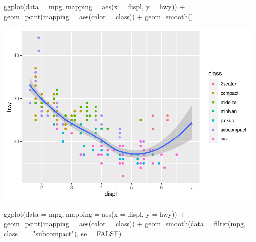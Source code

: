 \documentclass[
]{article}
\newenvironment{Shaded}{\begin{snugshade}}{\end{snugshade}}
\newcommand{\AttributeTok}[1]{\textcolor[rgb]{0.77,0.63,0.00}{#1}}
\newcommand{\ConstantTok}[1]{\textcolor[rgb]{0.00,0.00,0.00}{#1}}
\newcommand{\FunctionTok}[1]{\textcolor[rgb]{0.00,0.00,0.00}{#1}}
\newcommand{\NormalTok}[1]{#1}
\newcommand{\SpecialCharTok}[1]{\textcolor[rgb]{0.00,0.00,0.00}{#1}}
\newcommand{\StringTok}[1]{\textcolor[rgb]{0.31,0.60,0.02}{#1}}
\begin{document}
\begin{Shaded}
\begin{Highlighting}[]
\FunctionTok{ggplot}\NormalTok{(}\AttributeTok{data =}\NormalTok{ mpg, }\AttributeTok{mapping =} \FunctionTok{aes}\NormalTok{(}\AttributeTok{x =}\NormalTok{ displ, }\AttributeTok{y =}\NormalTok{ hwy)) }\SpecialCharTok{+} 
  \FunctionTok{geom\_point}\NormalTok{(}\AttributeTok{mapping =} \FunctionTok{aes}\NormalTok{(}\AttributeTok{color =}\NormalTok{ class)) }\SpecialCharTok{+} 
  \FunctionTok{geom\_smooth}\NormalTok{()}
\end{Highlighting}
\end{Shaded}

\includegraphics{Journal_files/figure-latex/unnamed-chunk-43-3.pdf}

\begin{Shaded}
\begin{Highlighting}[]
\FunctionTok{ggplot}\NormalTok{(}\AttributeTok{data =}\NormalTok{ mpg, }\AttributeTok{mapping =} \FunctionTok{aes}\NormalTok{(}\AttributeTok{x =}\NormalTok{ displ, }\AttributeTok{y =}\NormalTok{ hwy)) }\SpecialCharTok{+} 
  \FunctionTok{geom\_point}\NormalTok{(}\AttributeTok{mapping =} \FunctionTok{aes}\NormalTok{(}\AttributeTok{color =}\NormalTok{ class)) }\SpecialCharTok{+} 
  \FunctionTok{geom\_smooth}\NormalTok{(}\AttributeTok{data =} \FunctionTok{filter}\NormalTok{(mpg, class }\SpecialCharTok{==} \StringTok{"subcompact"}\NormalTok{), }\AttributeTok{se =} \ConstantTok{FALSE}\NormalTok{)}
\end{Highlighting}
\end{Shaded}
\end{document}
